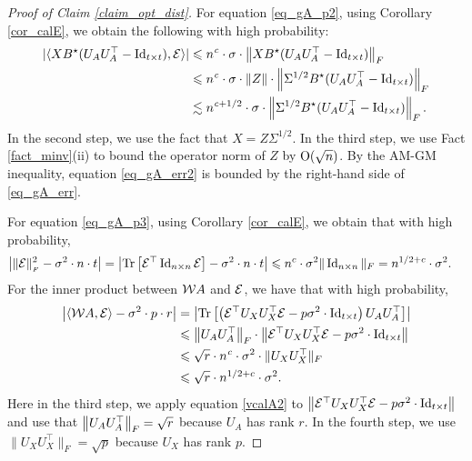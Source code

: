 \begin{proof}[Proof of Claim \ref{claim_opt_dist}]
	For equation \eqref{eq_gA_p2}, 
	using Corollary \ref{cor_calE}, we obtain the following with high probability:
	\begin{align}
		|\langle XB^{\star} (U_AU_A^{\top} - \operatorname{Id}_{t\times t}), \mathcal{E} \rangle| &\leqslant n^{\mathit{c}} \cdot \sigma \cdot \left\| XB^{\star} (U_AU_A^{\top} - \operatorname{Id}_{t\times t}) \right\|_{F} \nonumber \\
		&\leqslant n^{{\mathit{c}}} \cdot \sigma \cdot \|Z\| \cdot \left\| \Sigma^{1/2} B^{\star}(U_AU_A^{\top} -\operatorname{Id}_{t\times t}) \right\|_{F} \nonumber \\
		&\lesssim n^{{\mathit{c}} + 1/2} \cdot \sigma \cdot \left\| \Sigma^{1/2} B^{\star}(U_AU_A^{\top} -\operatorname{Id}_{t\times t}) \right\|_{F} . \label{eq_gA_err2}
	\end{align}
	In the second step, we use the fact that $X=Z\Sigma^{1/2}$.
	In the third step, we use Fact \ref{fact_minv}(ii) to bound the operator norm of $Z$ by $\operatorname{O}(\sqrt{n})$.
	By the AM-GM inequality, equation \eqref{eq_gA_err2} is bounded by the right-hand side of \eqref{eq_gA_err}.

	For equation \eqref{eq_gA_p3}, using Corollary \ref{cor_calE},
	we obtain that with high probability,
	\begin{align}
		\left\lvert\|\mathcal{E}\|_{_{F}}^2 - \sigma^2 \cdot n \cdot t\right\rvert=\left\lvert\operatorname{Tr}\left[ \mathcal E^\top \operatorname{Id}_{n\times n}\mathcal E\right] - \sigma^2 \cdot n \cdot t\right\rvert &\leqslant n^{c} \cdot \sigma^2 \| \operatorname{Id}_{n\times n}\|_F
		= n^{1/2+c} \cdot \sigma^2. \label{eq_gA_err3}
	\end{align}
	For the inner product between ${\mathcal W} A$ and $\mathcal{E}$, we have that with high probability,
	\begin{align}
		\bigabs{\inner{\cW A}{\cE} - \sigma^2\cdot p \cdot r } &= \bigabs{\bigtr{\left(\cE^\top U_X U_X^{\top}\cE  - p\sigma^2 \cdot  \id_{t\times t} \right)  U_AU_A^{\top} }} \nonumber  \\
		&\le \bignormFro{U_{A} U_A^{\top}} \cdot \bignorm{\cE^\top U_X U_X^{\top} \cE - p \sigma^2 \cdot  \id_{t\times t}} \nonumber \\
		&\le \sqrt{r} \cdot n^{\e}\cdot \sigma^2\cdot \|U_X U_X^\top\|_F \nonumber \\
		&\le \sqrt{r} \cdot n^{1/2+c} \cdot \sigma^2. \label{eq_gA_err4} %
	\end{align}
	Here in the third step, we apply equation \eqref{vcalA2} to $\left\| \mathcal{E}^\top U_X U_X^{\top} \mathcal{E} - p \sigma^2 \cdot  \operatorname{Id}_{t\times t} \right\|$ and use that $ \left\| U_{A} U_A^{\top} \right\|_{F}=\sqrt{r}$ because $U_A$ has rank $r$. In the fourth step, we use $\|U_X U_X^\top\|_F=\sqrt{p}$ because $U_X$ has rank $p$.


\end{proof}

